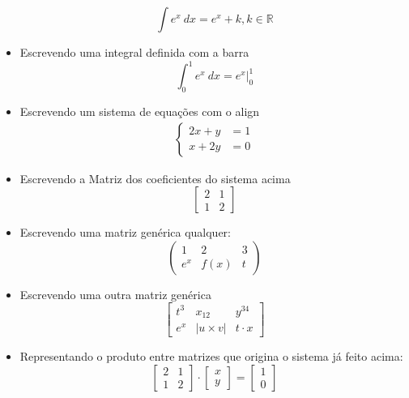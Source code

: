 \documentclass[12pt,a4paper]{article}
\begin{document}
\begin{itemize}
    \begin{equation}
        \int e^{x}\ dx = e^{x} + k, k \in \mathbb{R}
    \end{equation}
    \item Escrevendo uma integral definida com a barra 
    \begin{equation}
        \int_{0}^{1} e^{x} \ dx = e^{x} \Big |_{0}^{1}
    \end{equation}
    \item Escrevendo um sistema de equações com o align 
    \begin{align}
        \begin{cases}
            2x + y &= 1\\
            x + 2y &= 0
        \end{cases}
    \end{align}
    \item Escrevendo a Matriz dos coeficientes do sistema acima
    \begin{equation}
        \begin{bmatrix}
            2 & 1 \\
            1 & 2
        \end{bmatrix}
    \end{equation}
    \item Escrevendo uma matriz genérica qualquer:
    \begin{equation}
        \begin{pmatrix}
            1 & 2 & 3 \\
            e^{x} & f(x) & t 
        \end{pmatrix}
    \end{equation}
    \item Escrevendo uma outra matriz genérica 
    \begin{equation}
        \begin{bmatrix}
            t^{3} & x_{12} & y^{34} \\ 
            e^{x} & |u \times v| & t \cdot x
        \end{bmatrix}
    \end{equation}
    \item Representando o produto entre matrizes que origina o sistema já feito acima:
    \begin{equation}
        \begin{bmatrix}
            2 & 1 \\ 
            1 & 2 
        \end{bmatrix}
        \cdot 
        \begin{bmatrix}
            x \\ 
            y
        \end{bmatrix}
        =
        \begin{bmatrix}
            1 \\
            0
        \end{bmatrix}
    \end{equation}
\end{itemize}
\end{document}
